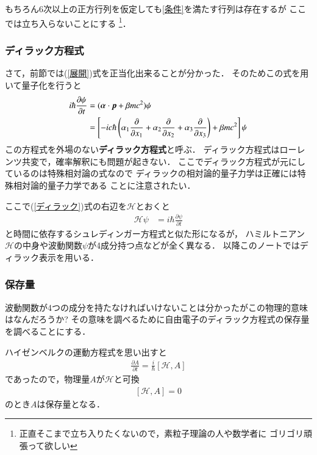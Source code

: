 \documentclass[a4paper,11pt]{jsarticle}
\numberwithin{equation}{section}
\newcommand{\bvec}[1]{\mbox{\boldmath $#1$}}
\begin{document}
もちろん6次以上の正方行列を仮定しても\eqref{条件}を満たす行列は存在するが
ここでは立ち入らないことにする
\footnote{正直そこまで立ち入りたくないので，素粒子理論の人や数学者に
ゴリゴリ頑張って欲しい}．

\subsubsection{ディラック方程式}
さて，前節では(\ref{展開})式を正当化出来ることが分かった．
そのためこの式を用いて量子化を行うと
\begin{align}
  i\hbar \frac{\partial \psi}{\partial t} &= (\bvec{\alpha}\cdot\bvec{p} + \beta mc^2)\psi\nonumber\\
  &= \left[-ic\hbar
  \left(
    \alpha_1 \frac{\partial }{\partial x_1}+\alpha_2 \frac{\partial }{\partial x_2}+\alpha_3 \frac{\partial }{\partial x_3}
  \right)
  +\beta mc^2
  \right]\psi 
\label{ディラック}
\end{align}
この方程式を外場のない\textbf{ディラック方程式}と呼ぶ．
ディラック方程式はローレンツ共変で，確率解釈にも問題が起きない．
ここでディラック方程式が元にしているのは特殊相対論の式なので
ディラックの相対論的量子力学は正確には特殊相対論的量子力学である
ことに注意されたい．

ここで{(\ref{ディラック})}式の右辺を$\mathcal{H}$とおくと
\begin{align}
  \mathcal{H}\psi &= i\hbar \frac{\partial \psi}{\partial t}
\end{align}
と時間に依存するシュレディンガー方程式と似た形になるが，
ハミルトニアン$\mathcal{H}$の中身や波動関数$\psi$が4成分持つ点などが全く異なる．
以降このノートではディラック表示を用いる．


\subsubsection{保存量}
波動関数が4つの成分を持たなければいけないことは分かったがこの物理的意味はなんだろうか?
その意味を調べるために自由電子のディラック方程式の保存量を調べることにする．

ハイゼンベルクの運動方程式を思い出すと
\begin{align}
\frac{\partial A}{\partial t} = \frac{i}{\hbar}\left[\mathcal{H},A\right]  
\end{align}
であったので，物理量$A$が$\mathcal{H}$と可換
\begin{align}
  \left[\mathcal{H},A\right]  = 0
\end{align}
のとき$A$は保存量となる．
\end{document}
